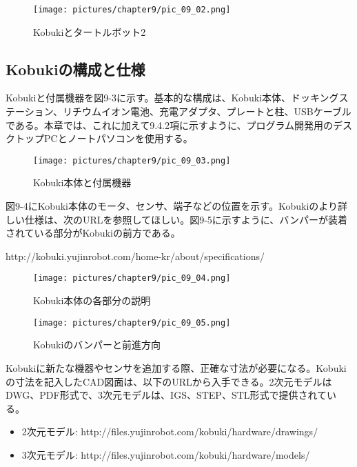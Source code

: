 \begin{figure}[htp]
  \centering
  \texttt{[image: pictures/chapter9/pic\_09\_02.png]}
  \caption{Kobukiとタートルボット2}
\end{figure}


\subsection{Kobukiの構成と仕様}

Kobukiと付属機器を図9-3に示す。基本的な構成は、Kobuki本体、ドッキングステーション、リチウムイオン電池、充電アダプタ、プレートと柱、USBケーブルである。本章では、これに加えて9.4.2項に示すように、プログラム開発用のデスクトップPCとノートパソコンを使用する。

\begin{figure}[htp]
  \centering
  \texttt{[image: pictures/chapter9/pic\_09\_03.png]}
  \caption{Kobuki本体と付属機器}
\end{figure}


図9-4にKobuki本体のモータ、センサ、端子などの位置を示す。Kobukiのより詳しい仕様は、次のURLを参照してほしい。図9-5に示すように、バンパーが装着されている部分がKobukiの前方である。

http://kobuki.yujinrobot.com/home-kr/about/specifications/

\begin{figure}[htp]
  \centering
  \texttt{[image: pictures/chapter9/pic\_09\_04.png]}
  \caption{Kobuki本体の各部分の説明}
\end{figure}


\begin{figure}[htp]
  \centering
  \texttt{[image: pictures/chapter9/pic\_09\_05.png]}
  \caption{Kobukiのバンパーと前進方向}
\end{figure}

\begin{exercise}[KobukiのCAD図面の入手方法]
  Kobukiに新たな機器やセンサを追加する際、正確な寸法が必要になる。Kobukiの寸法を記入したCAD図面は、以下のURLから入手できる。2次元モデルはDWG、PDF形式で、3次元モデルは、IGS、STEP、STL形式で提供されている。
  \begin{itemize}
    \item  2次元モデル:  http://files.yujinrobot.com/kobuki/hardware/drawings/
    \item  3次元モデル:  http://files.yujinrobot.com/kobuki/hardware/models/
  \end{itemize}
\end{exercise}

